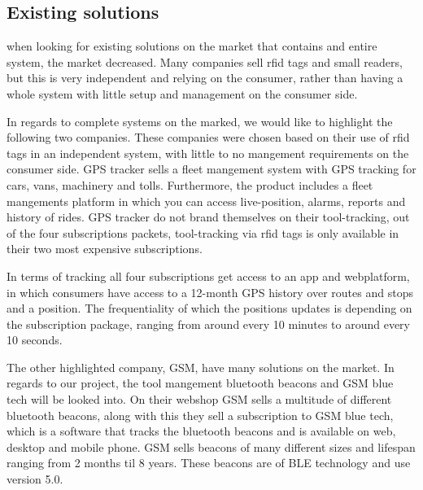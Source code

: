 \subsection{Existing solutions}
when looking for existing solutions on the market that contains and entire system, the market decreased. Many companies sell rfid tags and small readers, but this is very independent and relying on the consumer, rather than having a whole system with little setup and management on the consumer side. 

In regards to complete systems on the marked, we would like to highlight the following two companies. These companies were chosen based on their use of rfid tags in an independent system, with little to no mangement requirements on the consumer side. GPS tracker sells a fleet mangement system with GPS tracking for cars, vans, machinery and tolls. Furthermore, the product includes a fleet mangements platform in which you can access live-position, alarms, reports and history of rides. GPS tracker do not brand themselves on their tool-tracking, out of the four subscriptions packets, tool-tracking via rfid tags is only available in their two most expensive subscriptions. 

In terms of tracking all four subscriptions get access to an app and webplatform, in which consumers have access to a 12-month GPS history over routes and stops and a position. The frequentiality of which the positions updates is depending on the subscription package, ranging from around every 10 minutes to around every 10 seconds. 


The other highlighted company, GSM, have many solutions on the market. In regards to our project, the tool mangement bluetooth beacons and GSM blue tech will be looked into. On their webshop GSM sells a multitude of different bluetooth beacons, along with this they sell a subscription to GSM blue tech, which is a software that tracks the bluetooth beacons and is available on web, desktop and mobile phone. GSM sells beacons of many different sizes and lifespan ranging from 2 months til 8 years. These beacons are of BLE technology and use version 5.0. 